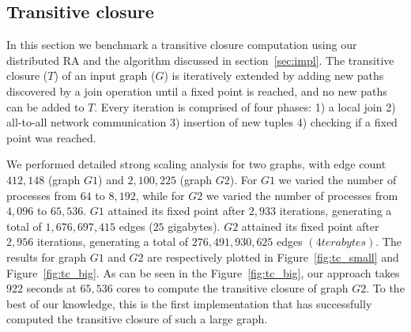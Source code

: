 \subsection{Transitive closure}
\label{sec:tc}

In this section we benchmark a transitive closure computation using our distributed RA and the algorithm discussed in section~\ref{sec:impl}.
The transitive closure ($T$) of an input graph ($G$) is iteratively extended by adding new paths discovered by a join operation until a fixed point is reached, and no new paths can be added to $T$.
Every iteration is comprised of four phases: 1) a local join 2) all-to-all network communication 3) insertion of new tuples 4) checking if a fixed point was reached.


We performed detailed strong scaling analysis for two graphs, with edge count $412,\!148$ (graph $G1$) and $2,\!100,\!225$ (graph $G2$).
For $G1$ we varied the number of processes from $64$ to $8,\!192$, while for $G2$ we varied the number of processes from $4,096$ to $65,\!536$. 
$G1$ attained its fixed point after $2,\!933$ iterations, generating a total of $1,\!676,\!697,\!415$ edges ($25$ gigabytes).
$G2$ attained its fixed point after $2,\!956$ iterations, generating a total of $276,\!491,\!930,\!625$ edges $(4 terabytes)$.
The results for graph $G1$ and $G2$ are respectively plotted in Figure~\ref{fig:tc_small} and Figure~\ref{fig:tc_big}. As can be seen in the Figure~\ref{fig:tc_big}, our approach takes $922$ seconds at $65,\!536$ cores to compute the transitive closure of graph $G2$. To the best of our knowledge, this is the first implementation that has successfully computed the transitive closure of such a large graph.

